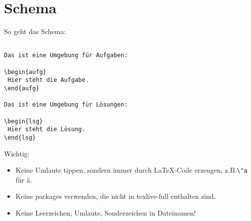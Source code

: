 \section*{Schema}

So geht das Schema:

\begin{center}
\begin{minipage}{.6\textwidth}
\begin{verbatim}

Das ist eine Umgebung für Aufgaben:

\begin{aufg}
 Hier steht die Aufgabe.
\end{aufg}

Das ist eine Umgebung für Lösungen:

\begin{lsg}
 Hier steht die Lösung.
\end{lsg}
\end{verbatim}
\end{minipage}
\end{center}

\bigskip 

Wichtig:
\begin{itemize}
 \item Keine Umlaute tippen, sondern immer durch LaTeX-Code erzeugen, z.B.\@ \verb!\"a! f\"ur \"a.
 \item Keine packages verwenden, die nicht in texlive-full enthalten sind. 
 \item Keine Leerzeichen, Umlaute, Sonderzeichen in Dateinamen!
\end{itemize}

